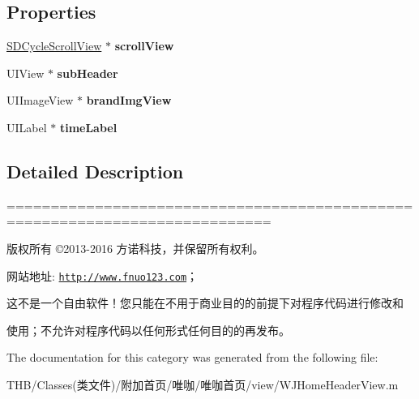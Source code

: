 \subsection*{Properties}
\begin{DoxyCompactItemize}
\item 
\mbox{\label{category_w_j_home_header_view_07_08_a58ba7184c8d158f2737a9394754a708f}} 
\mbox{\hyperlink{interface_s_d_cycle_scroll_view}{S\+D\+Cycle\+Scroll\+View}} $\ast$ {\bfseries scroll\+View}
\item 
\mbox{\label{category_w_j_home_header_view_07_08_a3cb3a69ffff5284cd32747a2e42dbadc}} 
U\+I\+View $\ast$ {\bfseries sub\+Header}
\item 
\mbox{\label{category_w_j_home_header_view_07_08_a1b6549ee74fee44a3b8cee04f6882eeb}} 
U\+I\+Image\+View $\ast$ {\bfseries brand\+Img\+View}
\item 
\mbox{\label{category_w_j_home_header_view_07_08_ae46f99ed1b0ca3d4dabec6c12e20f988}} 
U\+I\+Label $\ast$ {\bfseries time\+Label}
\end{DoxyCompactItemize}


\subsection{Detailed Description}
============================================================================

版权所有 ©2013-\/2016 方诺科技，并保留所有权利。

网站地址\+: \href{http://www.fnuo123.com}{\tt http\+://www.\+fnuo123.\+com}； 



这不是一个自由软件！您只能在不用于商业目的的前提下对程序代码进行修改和

使用；不允许对程序代码以任何形式任何目的的再发布。 

 

The documentation for this category was generated from the following file\+:\begin{DoxyCompactItemize}
\item 
T\+H\+B/\+Classes(类文件)/附加首页/唯咖/唯咖首页/view/W\+J\+Home\+Header\+View.\+m\end{DoxyCompactItemize}
